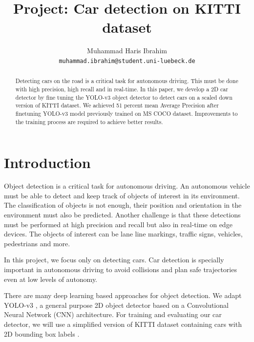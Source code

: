\documentclass[10pt,twocolumn,letterpaper]{article}
\begin{document}
\title{Project: Car detection on KITTI dataset}

\author{Muhammad Haris Ibrahim\\
{\tt\small muhammad.ibrahim@student.uni-luebeck.de}
}

\maketitle

\begin{abstract}
  Detecting cars on the road is a critical task for autonomous driving. This must be done with high precision, high recall and in real-time. 
  In this paper, we develop a 2D car detector by fine tuning the YOLO-v3 object detector to detect cars on a scaled down version of KITTI dataset. 
  We achieved 51 percent mean Average Precision after finetuning YOLO-v3 model previously trained on MS COCO dataset. 
  Improvements to the training process are required to achieve better results.
\end{abstract}

\section{Introduction}
Object detection is a critical task for autonomous driving. An autonomous vehicle must be able to detect and keep track of objects of interest in its environment. The classification of objects is not enough, their position and orientation in the environment must also be predicted. 
Another challenge is that these detections must be performed at high precision and recall but also in real-time on edge devices. The objects of interest can be lane line markings, traffic signs, vehicles, pedestrians and more. 

In this project, we focus only on detecting cars. Car detection is specially important in autonomous driving to avoid collisions and plan safe trajectories even at low levels of autonomy.

There are many deep learning based approaches for object detection. We adapt YOLO-v3 \cite{redmon2018yolov3}, a general purpose 2D object detector based on a Convolutional Neural Network (CNN) architecture. For training and evaluating our car detector, we will use a simplified version of KITTI dataset containing cars with 2D bounding box labels \cite{KITTI}.
\end{document}
